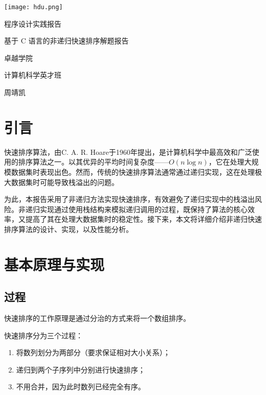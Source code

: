 \documentclass[12pt]{article}
\begin{document}
\begin{titlepage}


\parbox[c]{0pt}{
    \texttt{[image: hdu.png]}
}

\setlength{\parindent}{0pt}
\centering
\vfill
{ \heiti \textcolor{xblue}{程序设计实践报告}\par}
\vspace{10pt}
{ \heiti 基于 C 语言的非递归快速排序解题报告\par}
\vfill
{\large \heiti 卓越学院\par
计算机科学英才班\par
周靖凯\par
}
\vfill
\restoregeometry

\end{titlepage}

\renewcommand\contentsname{\textcolor{xblue}{目录}}
    \tableofcontents
\clearpage

\setcounter{page}{1}

\section{引言}

快速排序算法，由C. A. R. Hoare于1960年提出，是计算机科学中最高效和广泛使用的排序算法之一。以其优异的平均时间复杂度——$O(n \log n)$，它在处理大规模数据集时表现出色。然而，传统的快速排序算法通常通过递归实现，这在处理极大数据集时可能导致栈溢出的问题。

为此，本报告采用了非递归方法实现快速排序，有效避免了递归实现中的栈溢出风险。非递归实现通过使用栈结构来模拟递归调用的过程，既保持了算法的核心效率，又提高了其在处理大数据集时的稳定性。接下来，本文将详细介绍非递归快速排序算法的设计、实现，以及性能分析。

\newpage

\section{基本原理与实现}

\subsection{过程}

快速排序的工作原理是通过分治的方式来将一个数组排序。

快速排序分为三个过程：

\begin{enumerate}
    \item 将数列划分为两部分（要求保证相对大小关系）；
    \item 递归到两个子序列中分别进行快速排序；
    \item 不用合并，因为此时数列已经完全有序。
\end{enumerate}
\end{document}
